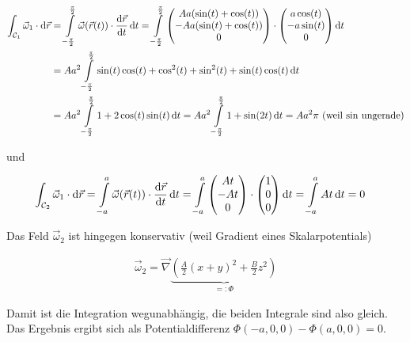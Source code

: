 \documentclass[a4paper,german,12pt,smallheadings]{scrartcl}
\begin{document}
\begin{align*}
  \int_{\mathcal{C}_1} \vec{\omega}_1 \cdot \dif\vec{r}
  &= \int\limits_{-\frac{\pi}{2}}^{\frac{\pi}{2}} \vec{\omega}(\vec{r}(t)) \cdot \frac{\dif\vec{r}}{\dif t} \dif t
  = \int\limits_{-\frac{\pi}{2}}^{\frac{\pi}{2}} \begin{pmatrix} Aa(\sin(t) + \cos(t)) \\ -Aa(\sin(t) + \cos(t)) \\ 0 \end{pmatrix} \cdot \begin{pmatrix} a\cos(t) \\ -a\sin(t) \\ 0 \end{pmatrix} \dif t \\
  &= Aa^2 \int\limits_{-\frac{\pi}{2}}^{\frac{\pi}{2}} \sin(t)\cos(t) + \cos^2(t) + \sin^2(t) + \sin(t)\cos(t) \dif t \\
  &= Aa^2 \int\limits_{-\frac{\pi}{2}}^{\frac{\pi}{2}} 1 + 2\cos(t)\sin(t) \dif t
  = Aa^2 \int\limits_{-\frac{\pi}{2}}^{\frac{\pi}{2}} 1 + \sin(2t) \dif t
  = Aa^2 \pi \text{ (weil $\sin$ ungerade)}
\end{align*}

und

\begin{align*}
  \int_{\mathcal{C}_2} \vec{\omega}_1 \cdot \dif\vec{r}
  &= \int\limits_{-a}^{a} \vec{\omega}(\vec{r}(t)) \cdot \frac{\dif\vec{r}}{\dif t} \dif t
  = \int\limits_{-a}^{a} \begin{pmatrix} At \\ -At \\ 0  \end{pmatrix} \cdot \begin{pmatrix} 1 \\ 0 \\ 0\end{pmatrix} \dif t
  = \int\limits_{-a}^{a} At \dif t = 0
\end{align*}

Das Feld $\vec{\omega}_2$ ist hingegen konservativ (weil Gradient eines Skalarpotentials)

\begin{align*}
  \vec{\omega}_2 = \vec{\nabla} \underbrace{\left( \frac{A}{2} (x+y)^2 + \frac{B}{2} z^2 \right)}_{=: \Phi}
\end{align*}

Damit ist die Integration wegunabhängig, die beiden Integrale sind also gleich.
Das Ergebnis ergibt sich als Potentialdifferenz $\Phi(-a, 0, 0) - \Phi(a, 0, 0)
= 0$.
\end{document}
